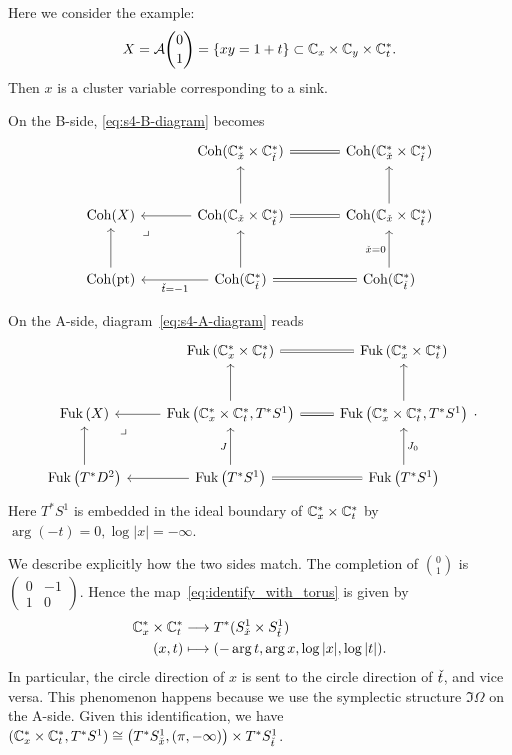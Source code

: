 \documentclass[12pt, letter]{amsart}
\DeclareMathOperator{\Fuk}{Fuk}
\theoremstyle{definition}
\begin{document}
Here we consider the example: $$X = \mathcal{A} \binom{0}{1} = \{ x y = 1 + t\} \subset \mathbb{C}_x \times \mathbb{C}_y \times \mathbb{C}^*_t.$$ Then \(x\) is a cluster variable corresponding to a sink. 

On the B-side, \eqref{eq:s4-B-diagram} becomes
\begin{equation}
\label{eq:node-B-diagram}
\begin{tikzcd}[column sep=large,row sep=large]
&\Coh(\bC_{\c x}^*\times\bC_{\c t}^*) \arrow[r, equal]
&\Coh( \bC_{\c x}^*\times\bC_{\c t}^* )\\
\Coh(X) \arrow[dr, phantom, "\lrcorner", very near start]
&\Coh(\bC_{\c x}\times\bC_{\c t}^*)\arrow[l]\arrow[u]\arrow[r, equal] 
&\Coh(\bC_{\c x}\times\bC_{\c t}^*) \arrow[u]\\
\Coh(\mathrm{pt})  \arrow[u]
&\Coh(  \bC_{\c t}^*)      \arrow[l,"\c t=-1"]
\arrow[u]\arrow[r,equal]
&\Coh(  \bC_{\c t}^* ) \arrow[u,"\c x=0"]
\end{tikzcd}
\end{equation}


On the A-side, diagram~\eqref{eq:s4-A-diagram} reads
\begin{equation}\label{eq:node-A-diagram}
\begin{tikzcd}[%
row sep=large]
&\Fuk\left(\bC_x^*\times\bC_t^*\right)\arrow[r, equal]
&\Fuk\left(  \bC_x^*\times\bC_t^*  \right)\\
\Fuk\left( X \right) \arrow[dr, phantom, "\lrcorner", very near start]
&
\Fuk\left( \bC_x^*\times\bC_t^*, T^*S^1 \right) \arrow[l]\arrow[u]
\arrow[r, equal]
&\Fuk \left(\bC_x^*\times\bC_t^* , T^*S^1 \right) \arrow[u]\\
\Fuk\left(T^*D^2\right) \arrow[u]
&\Fuk\left(T^*S^1\right)\arrow[l]
\arrow[u,"J"]\arrow[r,equal]
&\Fuk\left(T^*S^1\right)\arrow[u,"J_0"']
\end{tikzcd}.
\end{equation}
Here \(T^*S^1\) is embedded in the ideal boundary of \(\mathbb{C}^*_x \times \mathbb{C}^*_t\) by \( \arg(-t) = 0, \log|x| = -\infty \). 

We describe explicitly how the two sides match. 
The completion  of \( \binom{0}{1} \) is \( \begin{pmatrix}
    0 & -1 \\
    1 & 0
\end{pmatrix}
\). Hence the map~\eqref{eq:identify_with_torus} is given by
\begin{align*}
    \mathbb{C}^*_x \times \mathbb{C}^*_t & \longrightarrow T^*(S^1_{\check x} \times S^1_{\check t}) \\
    (x, t) & \longmapsto ( -\arg t, \arg x, \log |x|,  \log |t| ).  
\end{align*}
In particular, the circle direction of \(x\) is sent to the circle direction of \(\check t\), and vice versa.  
This phenomenon happens because we use the symplectic structure \(\Im \Omega\) on the A-side. Given this identification, we have \( (\mathbb{C}_x^* \times \mathbb{C}_t^* , T^*S^1) \cong\big( T^* S^1_{\check x}, { (\pi, -\infty)} \big)  \times T^*S^1_{\check t}  \). 
\end{document}
